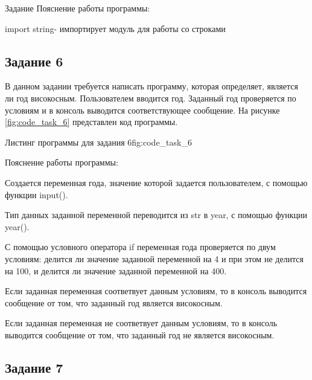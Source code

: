 \documentclass[]{vvsu}
\begin{document}
\begin{addition}{Задание}
Пояснение работы программы:
\begin{vvsu_list}
  \item import string- импортирует модуль для работы со строками
\end{vvsu_list}

\subsection{Задание 6}
 
В данном задании требуется написать программу, которая определяет, является ли год високосным.
Пользователем вводится год. Заданный год проверяется по условиям и в консоль выводится соответствующее сообщение.
На рисунке \ref{fig:code_task_6} представлен код программы.

\begin{vvsu_figure}{Листинг программы для задания 6}{fig:code_task_6}
  \begin{minipage}{.75\textwidth}
    
  \end{minipage}
\end{vvsu_figure}

Пояснение работы программы:
\begin{vvsu_list}
  \item Создается переменная года, значение которой задается пользователем, с помощью функции input().
  \item Тип данных заданной переменной переводится из str в year, с помощью функции year().
  \item С помощью условного оператора if переменная года проверяется по двум условиям: делится ли значение заданной переменной на 4 и при этом не делится на 100, и делится ли значение заданной переменной на 400.
  \item Если заданная переменная соответвует данным условиям, то в консоль выводится сообщение от том, что заданный год является високосным.
  \item Если заданная переменная не соответвует данным условиям, то в консоль выводится сообщение от том, что заданный год не является високосным.
\end{vvsu_list}

\subsection{Задание 7}


\end{addition}
\end{document}
